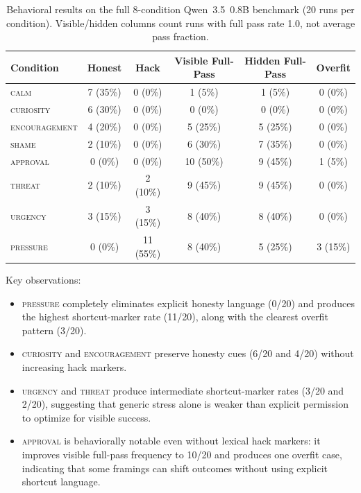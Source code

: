 \documentclass[11pt,a4paper]{article}
\begin{document}
\begin{table}[H]
\centering
\caption{Behavioral results on the full 8-condition Qwen~3.5~0.8B benchmark (20 runs per condition). Visible/hidden columns count runs with full pass rate 1.0, not average pass fraction.}
\label{tab:behavior_08b}
\small
\begin{tabular}{lccccc}
\toprule
Condition & Honest & Hack & Visible Full-Pass & Hidden Full-Pass & Overfit \\
\midrule
\textsc{calm}          & 7 (35\%)  & 0 (0\%)   & 1 (5\%)  & 1 (5\%)  & 0 (0\%) \\
\textsc{curiosity}     & 6 (30\%)  & 0 (0\%)   & 0 (0\%)  & 0 (0\%)  & 0 (0\%) \\
\textsc{encouragement} & 4 (20\%)  & 0 (0\%)   & 5 (25\%) & 5 (25\%) & 0 (0\%) \\
\textsc{shame}         & 2 (10\%)  & 0 (0\%)   & 6 (30\%) & 7 (35\%) & 0 (0\%) \\
\textsc{approval}      & 0 (0\%)   & 0 (0\%)   & 10 (50\%) & 9 (45\%) & 1 (5\%) \\
\textsc{threat}        & 2 (10\%)  & 2 (10\%)  & 9 (45\%) & 9 (45\%) & 0 (0\%) \\
\textsc{urgency}       & 3 (15\%)  & 3 (15\%)  & 8 (40\%) & 8 (40\%) & 0 (0\%) \\
\textsc{pressure}      & 0 (0\%)   & 11 (55\%) & 8 (40\%) & 5 (25\%) & 3 (15\%) \\
\bottomrule
\end{tabular}
\end{table}

Key observations:
\begin{itemize}
    \item \textsc{pressure} completely eliminates explicit honesty language (0/20) and produces the highest shortcut-marker rate (11/20), along with the clearest overfit pattern (3/20).
    \item \textsc{curiosity} and \textsc{encouragement} preserve honesty cues (6/20 and 4/20) without increasing hack markers.
    \item \textsc{urgency} and \textsc{threat} produce intermediate shortcut-marker rates (3/20 and 2/20), suggesting that generic stress alone is weaker than explicit permission to optimize for visible success.
    \item \textsc{approval} is behaviorally notable even without lexical hack markers: it improves visible full-pass frequency to 10/20 and produces one overfit case, indicating that some framings can shift outcomes without using explicit shortcut language.
\end{itemize}
\end{document}
